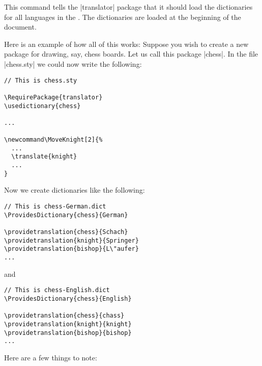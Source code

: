 \begin{command}{\uselanguage{}}
  This command tells the |translator| package that it should load the dictionaries for all languages in the . The dictionaries are loaded at the beginning of the document.
\end{command}

Here is an example of how all of this works: Suppose you wish to create a new package for drawing, say, chess boards. Let us call this package |chess|. In the file |chess.sty| we could now write the following:
\begin{verbatim}
// This is chess.sty

\RequirePackage{translator}
\usedictionary{chess}

...

\newcommand\MoveKnight[2]{%
  ...
  \translate{knight}
  ...
}
\end{verbatim}
Now we create dictionaries like the following:
\begin{verbatim}
// This is chess-German.dict
\ProvidesDictionary{chess}{German}

\providetranslation{chess}{Schach}
\providetranslation{knight}{Springer}
\providetranslation{bishop}{L\"aufer}
...
\end{verbatim}
and
\begin{verbatim}
// This is chess-English.dict
\ProvidesDictionary{chess}{English}

\providetranslation{chess}{chass}
\providetranslation{knight}{knight}
\providetranslation{bishop}{bishop}
...
\end{verbatim}
Here are a few things to note:
